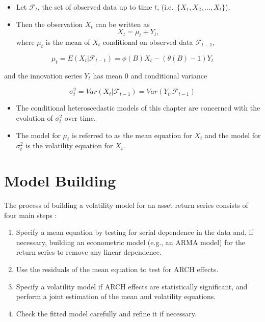 \documentclass[]{book}
\providecommand{\tightlist}{%
  \setlength{\itemsep}{0pt}\setlength{\parskip}{0pt}}
\begin{document}
\begin{itemize}
\item
  Let \(\mathcal{F}_t\), the set of observed data up to time \(t\), (i.e.~\(\{X_1,X_2,\dots, X_t\}\)).
\item
  Then the observation \(X_t\) can be written as
  \[X_t=\mu_t+Y_t,\]
  where \(\mu_t\) is the mean of \(X_t\) conditional on observed data \(\mathcal{F}_{t-1},\)
\end{itemize}

\[\mu_t=E(X_t|\mathcal{F}_{t-1})= \phi(B)X_t-(\theta(B)-1)Y_t\]

and the innovation series \(Y_t\) has mean 0 and conditional variance

\[\sigma_t^2=Var(X_t|\mathcal{F}_{t-1})=Var(Y_t|\mathcal{F}_{t-1})\]

\begin{itemize}
\tightlist
\item
  The conditional heteroscedastic models of this chapter are concerned with the evolution of \(\sigma_t^2\) over time.
\item
  The model for \(\mu_t\) is referred to as the mean equation for \(X_t\) and the model for \(\sigma^2_t\) is the volatility equation for \(X_t.\)
\end{itemize}

\hypertarget{model-building}{%
\section{Model Building}\label{model-building}}

The process of building a volatility model for an asset return series consists of four main steps \citep{tsay2010analysis}:

\begin{enumerate}
\def\labelenumi{\arabic{enumi}.}
\tightlist
\item
  Specify a mean equation by testing for serial dependence in the data and, if necessary, building an econometric model (e.g., an ARMA model) for the return series to remove any linear dependence.
\item
  Use the residuals of the mean equation to test for ARCH effects.
\item
  Specify a volatility model if ARCH effects are statistically significant, and perform a joint estimation of the mean and volatility equations.
\item
  Check the fitted model carefully and refine it if necessary.
\end{enumerate}
\end{document}
